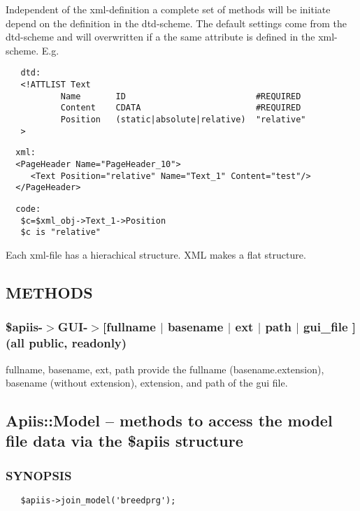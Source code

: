 Independent of the xml-definition a complete set of methods will be initiate
depend on the definition in the dtd-scheme. The default settings come from the
dtd-scheme and will overwritten if a the same attribute is defined in the
xml-scheme. E.g.

\begin{verbatim}
   dtd: 
   <!ATTLIST Text  
           Name       ID                          #REQUIRED
           Content    CDATA                       #REQUIRED
           Position   (static|absolute|relative)  "relative"
   >
\end{verbatim}
\begin{verbatim}
  xml:
  <PageHeader Name="PageHeader_10">
     <Text Position="relative" Name="Text_1" Content="test"/>
  </PageHeader>
\end{verbatim}
\begin{verbatim}
  code: 
   $c=$xml_obj->Text_1->Position
   $c is "relative"
\end{verbatim}


Each xml-file has a hierachical structure. XML makes a flat structure.

\subsection{METHODS\label{METHODS}}
\subsubsection*{\$apiis-$>$GUI-$>$[fullname $|$ basename $|$ ext $|$ path $|$ gui\_file ] (all public, readonly)\label{_apiis-_GUI-_fullname_basename_ext_path_gui_file_all_public_readonly_}}


fullname, basename, ext, path provide the fullname (basename.extension),
basename (without extension), extension, and path of the gui file.

\subsection{Apiis::Model -- methods to access the model file data via the \$apiis
structure\label{Apiis::Model_--_methods_to_access_the_model_file_data_via_the_apiis_structure}}




\subsubsection*{SYNOPSIS\label{Apiis::Model_--_methods_to_access_the_model_file_data_via_the_apiis_structure_SYNOPSIS}}
\begin{verbatim}
   $apiis->join_model('breedprg');
\end{verbatim}


